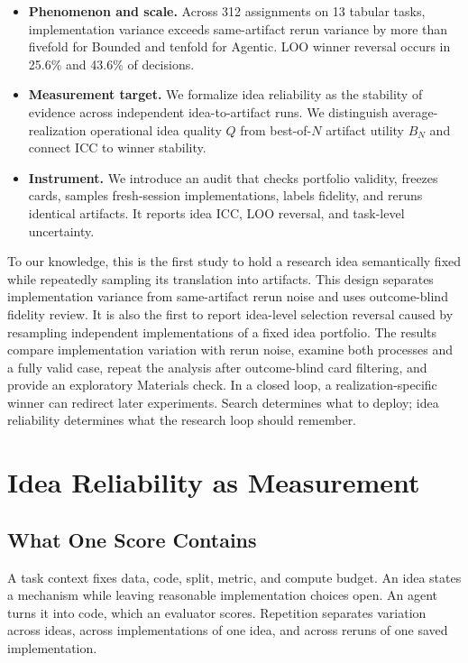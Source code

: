 \documentclass[letterpaper]{article}
\begin{document}
\begin{itemize}
\item \textbf{Phenomenon and scale.} Across 312 assignments on 13 tabular tasks, implementation variance exceeds same-artifact rerun variance by more than fivefold for Bounded and tenfold for Agentic. LOO winner reversal occurs in 25.6\% and 43.6\% of decisions.
\item \textbf{Measurement target.} We formalize idea reliability as the stability of evidence across independent idea-to-artifact runs. We distinguish average-realization operational idea quality $Q$ from best-of-$N$ artifact utility $B_N$ and connect ICC to winner stability.
\item \textbf{Instrument.} We introduce an audit that checks portfolio validity, freezes cards, samples fresh-session implementations, labels fidelity, and reruns identical artifacts. It reports idea ICC, LOO reversal, and task-level uncertainty.
\end{itemize}

To our knowledge, this is the first study to hold a research idea semantically fixed while repeatedly sampling its translation into artifacts. This design separates implementation variance from same-artifact rerun noise and uses outcome-blind fidelity review. It is also the first to report idea-level selection reversal caused by resampling independent implementations of a fixed idea portfolio. The results compare implementation variation with rerun noise, examine both processes and a fully valid case, repeat the analysis after outcome-blind card filtering, and provide an exploratory Materials check. In a closed loop, a realization-specific winner can redirect later experiments. Search determines what to deploy; idea reliability determines what the research loop should remember.

\section{Idea Reliability as Measurement}

\subsection{What One Score Contains}

A task context fixes data, code, split, metric, and compute budget. An idea states a mechanism while leaving reasonable implementation choices open. An agent turns it into code, which an evaluator scores. Repetition separates variation across ideas, across implementations of one idea, and across reruns of one saved implementation.
\end{document}
